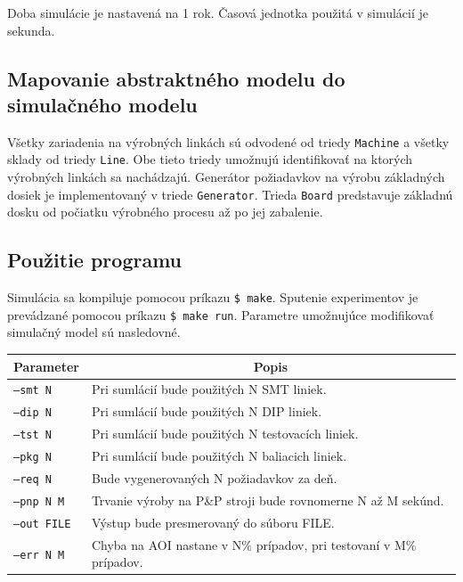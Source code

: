 \documentclass[12pt,a4paper,titlepage,final]{article}
\begin{document}
Doba simulácie je nastavená na 1 rok. Časová jednotka použitá v simulácií je 
sekunda.

\subsection{Mapovanie abstraktného modelu do simulačného modelu}
Všetky zariadenia na výrobných linkách sú odvodené od triedy \texttt{Machine}
a všetky sklady od triedy \texttt{Line}. Obe tieto triedy umožnujú identifikovať
na ktorých výrobných linkách sa nachádzajú. Generátor požiadavkov na výrobu základných
dosiek je implementovaný v triede \texttt{Generator}. Trieda \texttt{Board} predstavuje
základnú dosku od počiatku výrobného procesu až po jej zabalenie. 

\subsection{Použitie programu}
Simulácia sa kompiluje pomocou príkazu \texttt{\$ make}. Sputenie experimentov
je prevádzané pomocou príkazu \texttt{\$ make run}. Parametre umožnujúce modifikovať
simulačný model sú nasledovné.

\begin{table}[h]
\centering
\begin{tabular}{|l|l|}
\hline
\multicolumn{1}{|c|}{\textbf{Parameter}} & \multicolumn{1}{c|}{\textbf{Popis}}  \\ \hline
\texttt{--smt N}    & Pri sumlácií bude použitých N SMT liniek.                          \\ \hline
\texttt{--dip N}    & Pri sumlácií bude použitých N DIP liniek.                          \\ \hline
\texttt{--tst N}    & Pri sumlácií bude použitých N testovacích liniek.                  \\ \hline
\texttt{--pkg N}    & Pri sumlácií bude použitých N baliacich liniek.                    \\ \hline
\texttt{--req N}    & Bude vygenerovaných N požiadavkov za deň.                          \\ \hline
\texttt{--pnp N M}  & Trvanie výroby na P\&P stroji bude rovnomerne N až M sekúnd.       \\ \hline
\texttt{--out FILE} & Výstup bude presmerovaný do súboru FILE.                           \\ \hline
\texttt{--err N M}  & Chyba na AOI nastane v N\% prípadov, pri testovaní v M\% prípadov. \\ \hline
\end{tabular}
\end{table}
\end{document}
